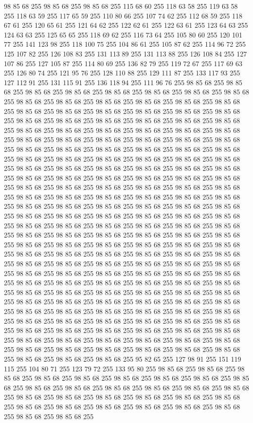 98 85 68 255 98 85 68 255 98 85 68 255 115 68 60 255 118 63 58 255 119 63 58 255 118 63 59 255 117 65 59 255 110 80 66 255 107 74 62 255 112 68 59 255 118 67 61 255 120 65 61 255 121 64 62 255 122 62 61 255 122 63 61 255 123 64 63 255 124 63 63 255 125 65 65 255 118 69 62 255 116 73 64 255 105 80 60 255 120 101 77 255 141 123 98 255 118 100 75 255 104 86 61 255 105 87 62 255 114 96 72 255 125 107 82 255 126 108 83 255 131 113 89 255 131 113 88 255 126 108 84 255 127 107 86 255 127 105 87 255 114 80 69 255 136 82 79 255 119 72 67 255 117 69 63 255 126 80 74 255 121 95 76 255 128 110 88 255 129 111 87 255 133 117 93 255 127 112 91 255 131 115 91 255 136 118 94 255 111 96 76 255 98 85 68 255 98 85 68 255 98 85 68 255 98 85 68 255 98 85 68 255 98 85 68 255 98 85 68 255 98 85 68 255 98 85 68 255 98 85 68 255 98 85 68 255 98 85 68 255 98 85 68 255 98 85 68 255 98 85 68 255 98 85 68 255
98 85 68 255 98 85 68 255 98 85 68 255 98 85 68 255 98 85 68 255 98 85 68 255 98 85 68 255 98 85 68 255 98 85 68 255 98 85 68 255 98 85 68 255 98 85 68 255 98 85 68 255 98 85 68 255 98 85 68 255 98 85 68 255 98 85 68 255 98 85 68 255 98 85 68 255 98 85 68 255 98 85 68 255 98 85 68 255 98 85 68 255 98 85 68 255 98 85 68 255 98 85 68 255 98 85 68 255 98 85 68 255 98 85 68 255 98 85 68 255 98 85 68 255 98 85 68 255 98 85 68 255 98 85 68 255 98 85 68 255 98 85 68 255 98 85 68 255 98 85 68 255 98 85 68 255 98 85 68 255 98 85 68 255 98 85 68 255 98 85 68 255 98 85 68 255 98 85 68 255 98 85 68 255 98 85 68 255 98 85 68 255 98 85 68 255 98 85 68 255 98 85 68 255 98 85 68 255 98 85 68 255 98 85 68 255 98 85 68 255 98 85 68 255 98 85 68 255 98 85 68 255 98 85 68 255 98 85 68 255 98 85 68 255 98 85 68 255 98 85 68 255 98 85 68 255
98 85 68 255 98 85 68 255 98 85 68 255 98 85 68 255 98 85 68 255 98 85 68 255 98 85 68 255 98 85 68 255 98 85 68 255 98 85 68 255 98 85 68 255 98 85 68 255 98 85 68 255 98 85 68 255 98 85 68 255 98 85 68 255 98 85 68 255 98 85 68 255 98 85 68 255 98 85 68 255 98 85 68 255 98 85 68 255 98 85 68 255 98 85 68 255 98 85 68 255 98 85 68 255 98 85 68 255 98 85 68 255 98 85 68 255 98 85 68 255 98 85 68 255 98 85 68 255 98 85 68 255 98 85 68 255 98 85 68 255 98 85 68 255 98 85 68 255 98 85 68 255 98 85 68 255 98 85 68 255 98 85 68 255 98 85 68 255 98 85 68 255 98 85 68 255 98 85 68 255 98 85 68 255 98 85 68 255 98 85 68 255 98 85 68 255 98 85 68 255 98 85 68 255 98 85 68 255 98 85 68 255 98 85 68 255 98 85 68 255 98 85 68 255 98 85 68 255 98 85 68 255 98 85 68 255 98 85 68 255 98 85 68 255 98 85 68 255 98 85 68 255 98 85 68 255
98 85 68 255 98 85 68 255 98 85 68 255 98 85 68 255 98 85 68 255 98 85 68 255 98 85 68 255 98 85 68 255 98 85 68 255 98 85 68 255 98 85 68 255 98 85 68 255 98 85 68 255 98 85 68 255 98 85 68 255 98 85 68 255 98 85 68 255 98 85 68 255 98 85 68 255 98 85 68 255 98 85 68 255 98 85 68 255 98 85 68 255 98 85 68 255 98 85 68 255 98 85 68 255 98 85 68 255 98 85 68 255 98 85 68 255 95 82 65 255 127 98 91 255 151 119 115 255 104 80 71 255 123 79 72 255 133 95 80 255 98 85 68 255 98 85 68 255 98 85 68 255 98 85 68 255 98 85 68 255 98 85 68 255 98 85 68 255 98 85 68 255 98 85 68 255 98 85 68 255 98 85 68 255 98 85 68 255 98 85 68 255 98 85 68 255 98 85 68 255 98 85 68 255 98 85 68 255 98 85 68 255 98 85 68 255 98 85 68 255 98 85 68 255 98 85 68 255 98 85 68 255 98 85 68 255 98 85 68 255 98 85 68 255 98 85 68 255 98 85 68 255 98 85 68 255
